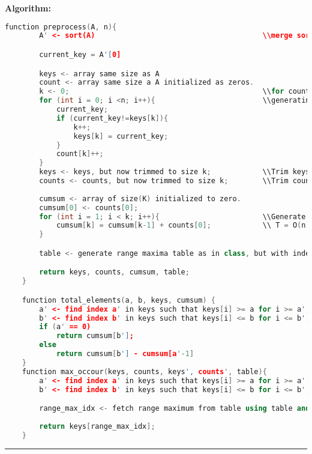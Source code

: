 \documentclass[10pt, a4paper]{article}
\begin{document}
\noindent\textbf{Algorithm:}
\begin{lstlisting}[language=C++,caption=Problem 8]
    function preprocess(A, n){
        A' <- sort(A)                                       \\merge sort T = O(nlogn)

        current_key = A'[0]

        keys <- array same size as A
        count <- array same size a A initialized as zeros.
        k <- 0;                                             \\for counting keys
        for (int i = 0; i <n; i++){                         \\generating keys and counts T = O(n)
            current_key;
            if (current_key!=keys[k]){
                k++;
                keys[k] = current_key;
            }
            count[k]++;
        }
        keys <- keys, but now trimmed to size k;            \\Trim keys T = O(n)
        counts <- counts, but now trimmed to size k;        \\Trim counts T = O(n)
    
        cumsum <- array of size(K) initialized to zero.
        cumsum[0] <- counts[0];
        for (int i = 1; i < k; i++){                        \\Generate cumulative sum of counts
            cumsum[k] = cumsum[k-1] + counts[0];            \\ T = O(n)
        }

        table <- generate range maxima table as in class, but with index of keys instead of value.  \\T = O(nlogn), S = O(nlogn) 

        return keys, counts, cumsum, table;
    }

    function total_elements(a, b, keys, cumsum) {
        a' <- find index a' in keys such that keys[i] >= a for i >= a'; \\Binary search
        b' <- find index b' in keys such that keys[i] <= b for i <= b'; \\Binary search
        if (a' == 0)
            return cumsum[b'];
        else 
            return cumsum[b'] - cumsum[a'-1]
    }
    function max_occour(keys, counts, keys', counts', table){
        a' <- find index a' in keys such that keys[i] >= a for i >= a'; \\Binary search
        b' <- find index b' in keys such that keys[i] <= b for i <= b'; \\Binary search

        range_max_idx <- fetch range maximum from table using table and counts. \\T = O(1)
        
        return keys[range_max_idx];
    }
\end{lstlisting}
\rule{\textwidth}{1px}
\end{document}
